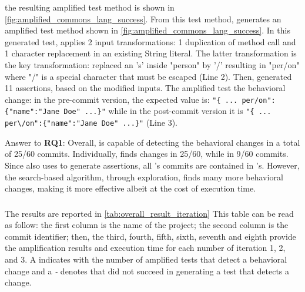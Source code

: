 the resulting amplified test method is shown in \autoref{fig:amplified_commons_lang_success}.
From this test method, \DCI generates an amplified test method shown in \autoref{fig:amplified_commons_lang_success}. 
In this generated test, \sbampl applies 2 input transformations: 1 duplication of method call and 1 character replacement in an existing String literal.
The latter transformation is the key transformation: \DCI replaced an 's' inside "person" by '/' resulting in "per/on" where "/" is a special character that must be escaped (Line 2). 
Then, \DCI generated 11 assertions, based on the modified inputs. 
The amplified test the behavioral change:
in the pre-commit version, the expected value is: \texttt{"\{ ... per/on":\{"name":"Jane Doe" ...\}"} while in the post-commit version it is \texttt{"\{ ... per\textbackslash/on":\{"name":"Jane Doe" ...\}"} (Line 3).
 
\begin{mdframed}
Answer to \textbf{RQ1}: Overall, \DCI is capable of detecting the behavioral changes in a total of 25/60 commits. Individually, \DCII finds changes in 25/60, while \DCIA in 9/60 commits.
Since \DCII also uses \aampl to generate assertions, all \DCIA's commits are contained in \DCII's. However, the search-based algorithm, through exploration, finds many more behavioral changes, making it more effective albeit at the cost of execution time.
\end{mdframed}


\subsubsection{\rqiteration}
\label{subsec:dci:evaluation:rq2}

The results are reported in \autoref{tab:overall_result_iteration}
This table can be read as follow:
the first column is the name of the project;
the second column is the commit identifier;
then, the third, fourth, fifth, sixth, seventh and eighth provide the amplification results and execution time for each number of iteration 1, 2, and 3.
A \cmark indicates with the number of amplified tests that detect a behavioral change and a \textit{-} denotes that \DCI did not succeed in generating a test that detects a change.

